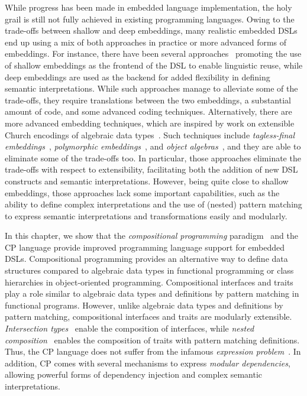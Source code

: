While progress has been made in embedded language implementation, the holy grail
is still not fully achieved in existing programming languages. Owing to the
trade-offs between shallow and deep embeddings, many realistic embedded DSLs end
up using a mix of both approaches in practice or more advanced forms of
embeddings. For instance, there have been several
approaches~\citep{rompf2012scala,svenningsson2015combining,jovanovic2014yinyang}
promoting the use of shallow embeddings as the frontend of the DSL to enable
linguistic reuse, while deep embeddings are used as the backend for added
flexibility in defining semantic interpretations. While such approaches manage
to alleviate some of the trade-offs, they require translations between the two
embeddings, a substantial amount of code, and some advanced coding techniques.
Alternatively, there are more advanced embedding techniques, which are inspired
by work on extensible Church encodings of algebraic data
types~\citep{hinze2006generics,oliveira2006extensible,oliveira2009modular}. Such
techniques include \emph{tagless-final
embeddings}~\citep{carette2009finally,kiselyov2010typed}, \emph{polymorphic
embeddings}~\citep{hofer2008polymorphic}, and \emph{object
algebras}~\citep{oliveira2012extensibility}, and they are able to eliminate some
of the trade-offs too. In particular, those approaches eliminate the trade-offs
with respect to extensibility, facilitating both the addition of new DSL
constructs and semantic interpretations. However, being quite close to shallow
embeddings, those approaches lack some important capabilities, such as the
ability to define complex interpretations and the use of (nested) pattern
matching to express semantic interpretations and transformations easily and
modularly.

In this chapter, we show that the \emph{compositional programming}
paradigm~\citep{zhang2021compositional} and the CP language provide improved
programming language support for embedded DSLs. Compositional programming
provides an alternative way to define data structures compared to algebraic data
types in functional programming or class hierarchies in object-oriented
programming. Compositional interfaces and traits play a role similar to
algebraic data types and definitions by pattern matching in functional programs.
However, unlike algebraic data types and definitions by pattern matching,
compositional interfaces and traits are modularly extensible. \emph{Intersection
types}~\citep{oliveira2016disjoint} enable the composition of interfaces, while
\emph{nested composition}~\citep{bi2018essence} enables the composition of
traits with pattern matching definitions.  Thus, the CP language does not suffer
from the infamous \emph{expression problem}~\citep{wadler1998expression}. In
addition, CP comes with several mechanisms to express \emph{modular
dependencies}, allowing powerful forms of dependency injection and complex
semantic interpretations.

